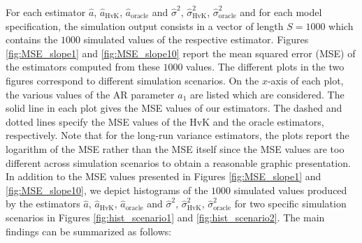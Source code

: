 For each estimator $\widehat{a}$, $\widehat{a}_{\text{HvK}}$, $\widehat{a}_{\text{oracle}}$ and $\widehat{\sigma}^2$, $\widehat{\sigma}^2_{\text{HvK}}$, $\widehat{\sigma}^2_{\text{oracle}}$ and for each model specification, the simulation output consists in a vector of length $S=1000$ which contains the $1000$ simulated values of the respective estimator. Figures \ref{fig:MSE_slope1} and \ref{fig:MSE_slope10} report the mean squared error (MSE) of the estimators computed from these $1000$ values. The different plots in the two figures correspond to different simulation scenarios. On the $x$-axis of each plot, the various values of the AR parameter $a_1$ are listed which are considered. The solid line in each plot gives the MSE values of our estimators. The dashed and dotted lines specify the MSE values of the HvK and the oracle estimators, respectively. Note that for the long-run variance estimators, the plots report the logarithm of the MSE rather than the MSE itself since the MSE values are too different across simulation scenarios to obtain a reasonable graphic presentation. In addition to the MSE values presented in Figures \ref{fig:MSE_slope1} and \ref{fig:MSE_slope10}, we depict histograms of the $1000$ simulated values produced by the estimators $\widehat{a}$, $\widehat{a}_{\text{HvK}}$, $\widehat{a}_{\text{oracle}}$ and $\widehat{\sigma}^2$, $\widehat{\sigma}^2_{\text{HvK}}$, $\widehat{\sigma}^2_{\text{oracle}}$ for two specific simulation scenarios in Figures \ref{fig:hist_scenario1} and \ref{fig:hist_scenario2}. The main findings can be summarized as follows:  
